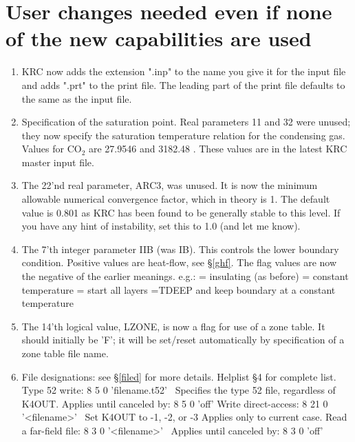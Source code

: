 \documentclass{article}
\begin{document}
\section {User changes needed even if none of the new capabilities are used \label{need}}
\begin{enumerate}    %


\item  KRC now adds the extension ".inp" to the name you give it for
  the input file and adds ".prt" to the print file.
  The leading part of the print file defaults to the same as the input file.

\item Specification of the saturation point. Real parameters 11 and 32 were
  unused; they now specify the saturation temperature relation for the
  condensing gas. Values for CO$_2$ are  27.9546 and 3182.48 . These values are in
  the latest KRC master input file.

\item The 22'nd real parameter, ARC3, was unused. It is now the minimum
  allowable numerical convergence factor, which in theory is 1. The default
  value is 0.801 as KRC has been found to be generally stable to this level. If
  you have any hint of instability, set this to 1.0 (and let me know).

 \item The 7'th integer parameter IIB (was IB). This controls the lower boundary
   condition. Positive values are heat-flow, see \S \ref{ghf}. The flag values
   are now the negative of the earlier meanings. e.g.:
 = insulating (as before)
 = constant temperature 
 = start all layers =TDEEP and keep boundary at a constant temperature 

\item The 14'th logical value, LZONE, is now a flag for use of a zone table. It
  should initially be 'F'; it will be set/reset automatically by specification
  of a zone table file name.

\item File designations: see \S \ref{filed} for more details. Helplist \S 4 for complete list.
\qi Type 52 write: 8 5 0 'filename.t52' \ Specifies the type 52 file, regardless of K4OUT.  Applies until canceled by: 8 5 0 'off'
\qi  Write direct-access: 8 21 0 '<filename>' \ Set K4OUT to -1, -2, or -3
\qii Applies only to current case. 
\qi Read a far-field file:  8  3 0 '<filename>' \ Applies until canceled by: 8 3 0 'off'

\end{enumerate}
\end{document}
